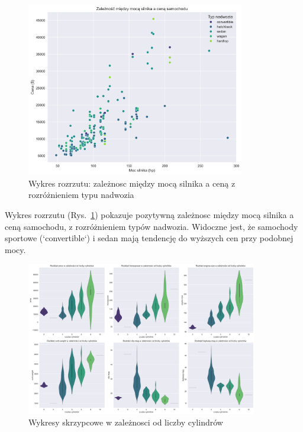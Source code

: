 \documentclass[12pt,a4paper]{article}
\begin{document}
\begin{figure}[H]
    \centering
    \includegraphics[width=0.85\textwidth]{figures/scatter_horsepower_price.png}
    \caption{Wykres rozrzutu: zależnosc między mocą silnika a ceną z rozróżnieniem typu nadwozia}
    \label{fig:scatter_horsepower_price}
\end{figure}

Wykres rozrzutu (Rys.~\ref{fig:scatter_horsepower_price}) pokazuje pozytywną zależnosc między mocą silnika a ceną samochodu, z rozróżnieniem typów nadwozia. Widoczne jest, że samochody sportowe (`convertible`) i sedan mają tendencję do wyższych cen przy podobnej mocy.

\begin{figure}[H]
    \centering
    \includegraphics[width=0.9\textwidth]{figures/violin_by_cylinders.png}
    \caption{Wykresy skrzypcowe w zależnosci od liczby cylindrów}
    \label{fig:violin_by_cylinders}
\end{figure}
\end{document}
